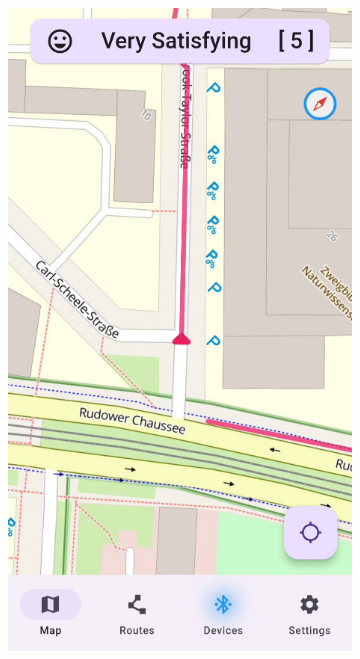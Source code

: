 \begin{figure}[!htb]
    \centering
    \begin{subfigure}{.25\textwidth}
        \centering
        \includegraphics[width=.8666\linewidth]{images/app_map_screen.jpg}
        \caption{\mapscreen}
        \label{subfig:app_map_screen}
    \end{subfigure}%
    \begin{subfigure}{.25\textwidth}
        \centering

\end{subfigure}
\end{figure}
